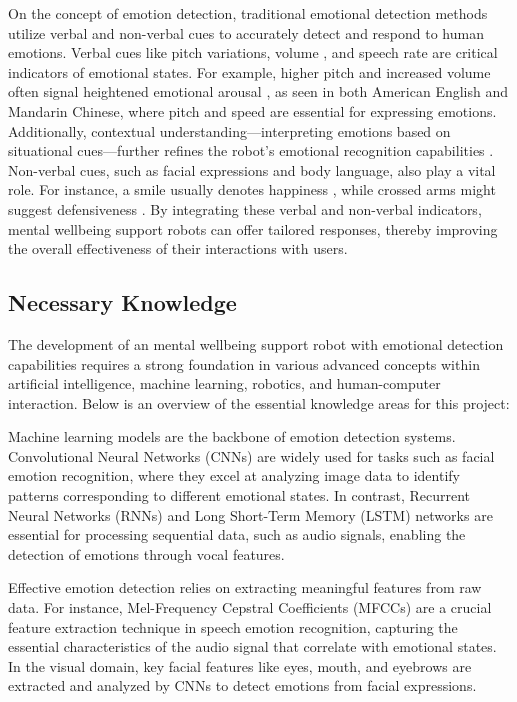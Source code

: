 On the concept of emotion detection, traditional emotional detection methods utilize verbal and non-verbal cues to accurately detect and respond to human emotions. Verbal cues like pitch variations, volume \cite{hakanpaa2021}, and speech rate \cite{wang2018} are critical indicators of emotional states. For example, higher pitch and increased volume often signal heightened emotional arousal \cite{rodero2011}, as seen in both American English and Mandarin Chinese, where pitch and speed are essential for expressing emotions. Additionally, contextual understanding—interpreting emotions based on situational cues—further refines the robot's emotional recognition capabilities \cite{abbas2023}. Non-verbal cues, such as facial expressions and body language, also play a vital role. For instance, a smile usually denotes happiness \cite{chapre2023}, while crossed arms might suggest defensiveness \cite{liu2024}. By integrating these verbal and non-verbal indicators, mental wellbeing support robots can offer tailored responses, thereby improving the overall effectiveness of their interactions with users.

\subsection{Necessary Knowledge}

The development of an mental wellbeing support robot with emotional detection capabilities requires a strong foundation in various advanced concepts within artificial intelligence, machine learning, robotics, and human-computer interaction. Below is an overview of the essential knowledge areas for this project:

Machine learning models are the backbone of emotion detection systems. Convolutional Neural Networks (CNNs) \cite{taye2023} are widely used for tasks such as facial emotion recognition, where they excel at analyzing image data to identify patterns corresponding to different emotional states. In contrast, Recurrent Neural Networks (RNNs) and Long Short-Term Memory (LSTM) networks \cite{schmidt2019} are essential for processing sequential data, such as audio signals, enabling the detection of emotions through vocal features.

Effective emotion detection relies on extracting meaningful features from raw data. For instance, Mel-Frequency Cepstral Coefficients (MFCCs) \cite{singh2014} are a crucial feature extraction technique in speech emotion recognition, capturing the essential characteristics of the audio signal that correlate with emotional states. In the visual domain, key facial features like eyes, mouth, and eyebrows are extracted and analyzed by CNNs to detect emotions from facial expressions.

